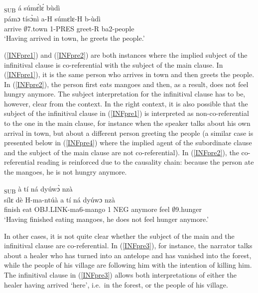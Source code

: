 \begin{exe}
\ex\label{INFpre1}
  \glll    [pámɔ̀ tísɔ̀nì]\textsubscript{SUB} á súmɛ́lɛ́ bùdì \\
            pámɔ tísɔ̀nì a-H súmɛlɛ-H b-ùdì \\
             arrive $\emptyset$7.town 1-PRES greet-R ba2-people   \\
    \trans `Having arrived in town, he greets the people.'
\end{exe}

(\ref{INFpre1}) and (\ref{INFpre2}) are both instances where the implied subject of the infinitival clause is co-referential with the subject of the main clause. In (\ref{INFpre1}), it is the same person who arrives in town and then greets the people. In (\ref{INFpre2}), the person first eats mangoes and then, as a result, does not feel hungry anymore. The subject interpretation for the infinitival clause has to be, however, clear from the context. In the right context, it is also possible that the subject of the infinitival clause in (\ref{INFpre1}) is interpreted as non-co-referential to the one in the main clause, for instance when the speaker talks about his own arrival in town, but about a different person greeting the people (a similar case is presented below in (\ref{INFpre4}) where the implied agent of the subordinate clause and the subject of the main clause are not co-referential). In (\ref{INFpre2}), the co-referential reading is reinforced due to the causality chain: because the person ate the mangoes, he is not hungry anymore. 

\begin{exe}
\ex \label{INFpre2}
  \glll   [sílɛ dè mántúà]\textsubscript{SUB} à tí ná dyúwɔ̀ nzà\\
           sílɛ dè H-ma-ntúà a tí ná dyúwɔ nzà\\
              finish eat OBJ.LINK-ma6-mango 1 NEG anymore feel $\emptyset$9.hunger\\
    \trans `Having finished eating mangoes, he does not feel hunger anymore.'
\end{exe}


In other cases, it is not quite clear whether the subject of the main and the infinitival clause are co-referential. In (\ref{INFpre3}), for instance, the narrator talks about a healer who has turned into an  antelope and has vanished into the forest, while the people of his village are following him with the intention of killing him. The infinitival clause in (\ref{INFpre3}) allows both interpretations of either the healer having arrived `here', i.e.\ in the forest, or the people of his village.

